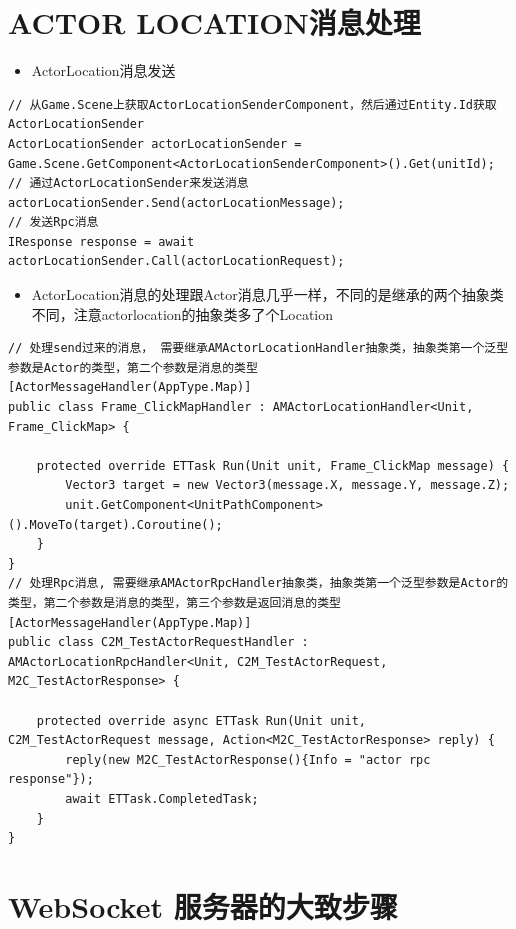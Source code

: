\documentclass[9pt, b5paper]{article}
\begin{document}
\section{ACTOR LOCATION消息处理}
\label{sec-28}
\begin{itemize}
\item ActorLocation消息发送
\end{itemize}
\begin{verbatim}
// 从Game.Scene上获取ActorLocationSenderComponent，然后通过Entity.Id获取ActorLocationSender
ActorLocationSender actorLocationSender = Game.Scene.GetComponent<ActorLocationSenderComponent>().Get(unitId);
// 通过ActorLocationSender来发送消息
actorLocationSender.Send(actorLocationMessage);
// 发送Rpc消息
IResponse response = await actorLocationSender.Call(actorLocationRequest);
\end{verbatim}
\begin{itemize}
\item ActorLocation消息的处理跟Actor消息几乎一样，不同的是继承的两个抽象类不同，注意actorlocation的抽象类多了个Location
\end{itemize}
\begin{verbatim}
// 处理send过来的消息， 需要继承AMActorLocationHandler抽象类，抽象类第一个泛型参数是Actor的类型，第二个参数是消息的类型
[ActorMessageHandler(AppType.Map)]
public class Frame_ClickMapHandler : AMActorLocationHandler<Unit, Frame_ClickMap> {

    protected override ETTask Run(Unit unit, Frame_ClickMap message) {
        Vector3 target = new Vector3(message.X, message.Y, message.Z);
        unit.GetComponent<UnitPathComponent>().MoveTo(target).Coroutine();
    }
}
// 处理Rpc消息, 需要继承AMActorRpcHandler抽象类，抽象类第一个泛型参数是Actor的类型，第二个参数是消息的类型，第三个参数是返回消息的类型
[ActorMessageHandler(AppType.Map)]
public class C2M_TestActorRequestHandler : AMActorLocationRpcHandler<Unit, C2M_TestActorRequest, M2C_TestActorResponse> {

    protected override async ETTask Run(Unit unit, C2M_TestActorRequest message, Action<M2C_TestActorResponse> reply) {
        reply(new M2C_TestActorResponse(){Info = "actor rpc response"});
        await ETTask.CompletedTask;
    }
}
\end{verbatim}
\section{WebSocket 服务器的大致步骤}
\label{sec-29}
\end{document}
